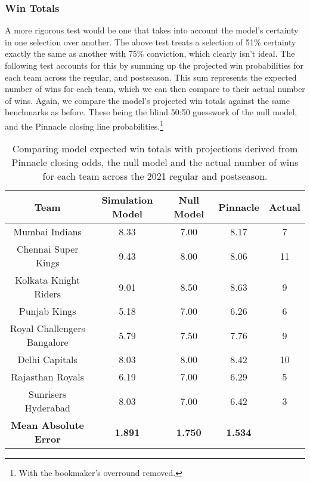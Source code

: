 
\subsubsection{Win Totals}

A more rigorous test would be one that takes into account the model's certainty in one selection over another. The above test treats a selection of 51\% certainty exactly the same as another with 75\% conviction, which clearly isn't ideal. The following test accounts for this by summing up the projected win probabilities for each team across the regular, and postseason. This sum represents the expected number of wins for each team, which we can then compare to their actual number of wins. Again, we compare the model's projected win totals against the same benchmarks as before. These being the blind 50:50 guesswork of the null model, and the Pinnacle closing line probabilities.\footnote{With the bookmaker's overround removed.}

\begin{table}[ht]
\vspace{0.5em}
\centering
\begin{tabular} {c c c c c} \toprule
    {Team} & {Simulation Model} & {Null Model} & {Pinnacle} & {Actual} \\ \midrule
     Mumbai Indians & 8.33 & 7.00 & 8.17 & 7 \\
     Chennai Super Kings & 9.43 & 8.00 & 8.06 & 11 \\
     Kolkata Knight Riders & 9.01 & 8.50 & 8.63 & 9 \\
     Punjab Kings & 5.18 & 7.00 & 6.26 & 6 \\
     Royal Challengers Bangalore & 5.79 & 7.50 & 7.76 & 9 \\
     Delhi Capitals & 8.03 & 8.00 & 8.42 & 10 \\
     Rajasthan Royals & 6.19 & 7.00 & 6.29 & 5 \\
     Sunrisers Hyderabad & 8.03 & 7.00 & 6.42 & 3 \\ \midrule
     \textbf{Mean Absolute Error} & \textbf{1.891} & \textbf{1.750} & \textbf{1.534} & \\ \bottomrule
\end{tabular}
\caption{Comparing model expected win totals with projections derived from Pinnacle closing odds, the null model and the actual number of wins for each team across the 2021 regular and postseason.}
\label{table: ex wins}
\end{table}

